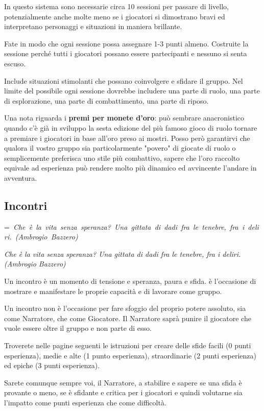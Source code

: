 \documentclass[a4paper,11pt,twoside,openany]{book}
\makeatletter
\newcommand{\mybox}[1]{%
	\setbox0=\hbox{#1}%
	\setlength{\@tempdima}{\dimexpr\wd0+13pt}%
	\begin{tcolorbox}[boxrule=0.5pt,arc=4pt, breakable,enhanced,
		left=6pt,right=6pt,top=6pt,bottom=6pt,boxsep=0pt,width=\@tempdima]
		#1
	\end{tcolorbox}
}
\makeatother
\begin{document}
{In questo sistema sono necessarie circa 10 sessioni per passare di livello, potenzialmente anche molte meno se i giocatori si dimostrano bravi ed interpretano personaggi e situazioni in maniera brillante. 

Fate in modo che ogni sessione possa assegnare 1-3 punti almeno. Costruite la sessione perché tutti i giocatori possano essere partecipanti e nessuno si senta escuso.

Include situazioni stimolanti che possano coinvolgere e sfidare il gruppo.
Nel limite del possibile ogni sessione dovrebbe includere una parte di ruolo, una parte di esplorazione, una parte di combattimento, una parte di riposo.

\bigskip

Una nota riguarda i \textbf{premi per monete d'oro}: può sembrare anacronistico quando c'è già in sviluppo la sesta edizione del più famoso gioco di ruolo tornare a premiare i giocatori in base all'oro preso ai mostri. Posso però garantirvi che qualora il vostro gruppo sia particolarmente "povero" di giocate di ruolo o semplicemente preferisca uno stile più combattivo, sapere che l'oro raccolto equivale ad esperienza può rendere molto più dinamico ed avvincente l'andare in avventura.

\subsection{Incontri}


\mybox{\textit{
{Che è la vita senza speranza? Una gittata di dadi fra le tenebre, fra i deliri. (Ambrogio Bazzero)}
}}\medskip

\label{incontri}

Un incontro è un momento di tensione e speranza, paura e sfida. è l'occasione di mostrare e manifestare le proprie capacità e di lavorare come gruppo.

Un incontro non è l'occasione per fare sfoggio del proprio potere assoluto, sia come Narratore, che come Giocatore. Il Narratore saprà punire il giocatore che vuole essere oltre il gruppo e non parte di esso.

Troverete nelle pagine seguenti le istruzioni per creare delle sfide facili (0 punti esperienza), medie e alte (1 punto esperienza), straordinarie (2 punti esperienza) ed epiche (3 punti esperienza).

Sarete comunque sempre voi, il Narratore, a stabilire e sapere se una sfida è provante o meno, se è sfidante e critica per i giocatori e quindi volutarne sia l'impatto come punti esperienza che come difficoltà.

}
\end{document}
